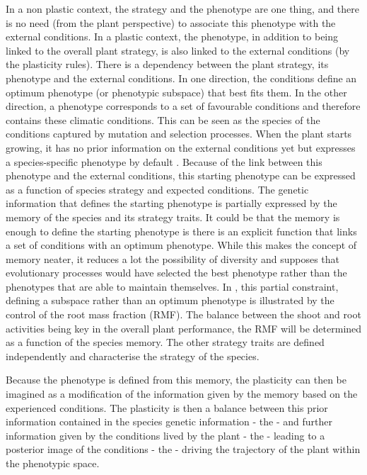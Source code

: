  In a non plastic context, the strategy and the phenotype are one thing, and there is no need (from the plant perspective) to associate this phenotype with the external conditions. In a plastic context, the phenotype, in addition to being linked to the overall plant strategy, is also linked to the external conditions (by the plasticity rules). There is a dependency between the plant strategy, its phenotype and the external conditions. In one direction, the conditions define an optimum phenotype (or phenotypic subspace) that best fits them. In the other direction, a phenotype corresponds to a set of favourable conditions and therefore contains these climatic conditions. This can be seen as the species  of the conditions captured by mutation and selection processes. When the plant starts growing, it has no prior information on the external conditions yet but expresses a species-specific phenotype by default . Because of the link between this phenotype and the external conditions, this starting phenotype can be expressed as a function of species strategy and expected conditions. The genetic information that defines the starting phenotype is partially expressed by the memory of the species and its strategy traits. It could be that the memory is enough to define the starting phenotype is there is an explicit function that links a set of conditions with an optimum phenotype. While this makes the concept of memory neater, it reduces a lot the possibility of diversity and supposes that evolutionary processes would have selected the best phenotype rather than the phenotypes that are able to maintain themselves. In \model, this partial constraint, defining a subspace rather than an optimum phenotype is illustrated by the control of the root mass fraction (RMF). The balance between the shoot and root activities being key in the overall plant performance, the RMF will be determined as a function of the species memory. The other strategy traits are defined independently and characterise the strategy of the species.
 
Because the phenotype is defined from this memory, the plasticity can then be imagined as a modification of the information given by the memory based on the experienced conditions. The plasticity is then a balance between this prior information contained in the species genetic information - the  - and further information given by the conditions lived by the plant - the  - leading to a posterior image of the conditions - the  - driving the trajectory of the plant within the phenotypic space.
 
